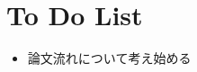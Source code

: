 \documentclass[11pt]{jsarticle}
\begin{document}
	\section{To Do List}
		\begin{itemize}
			\item 論文流れについて考え始める
		\end{itemize}
				
	\newpage
\vspace{10cm}
	

\vspace{14cm}
	\articleSPRfour
	\articleSPRfive
\end{document}
